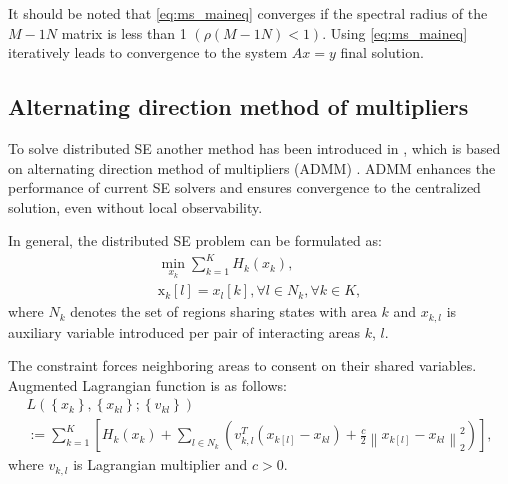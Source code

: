 It should be noted that \ref{eq:ms_maineq} converges if the spectral radius of the \(M-1N\) matrix is less than 1 \((\rho(M-1N) < 1)\). Using \ref{eq:ms_maineq} iteratively leads to convergence to the system \(Ax = y\) final solution.

\subsection{Alternating direction method of multipliers}\label{subsec:ch1/sec4/sub7}
To solve distributed SE another method has been introduced in \autocite{6340375}, which is based on alternating direction method of multipliers (ADMM) \autocite{boyd2004convex}. ADMM enhances the performance of current SE solvers and ensures convergence to the centralized solution, even without local observability.


In general, the distributed SE problem can be formulated as:
\begin{equation}
    \begin{array}{c}
\min _{x_{k}} \sum_{k=1}^{K} H_{k}\left(x_{k}\right), \\
\mathrm{x}_{k}[l]=x_{l}[k], \forall l \in N_{k}, \forall k \in K,
\end{array}
\end{equation}
where $N_k$ denotes the set of regions sharing states with area $k$ and $x_{k,l}$ is auxiliary variable introduced per pair of interacting areas $k$, $l$.

The constraint forces neighboring areas to consent on their shared variables. Augmented Lagrangian function is as follows:
\begin{equation}
    \begin{array}{c}
L\left(\left\{x_{k}\right\},\left\{x_{k l}\right\} ;\left\{v_{k l}\right\}\right) \\
:=\sum_{k=1}^{K}\left[H_{k}\left(x_{k}\right)+\sum_{l \in N_{k}}\left(v_{k, l}^{T}\left(x_{k[l]}-x_{k l}\right)+\frac{c}{2}\left\|x_{k[l]}-x_{k l}\right\|_{2}^{2}\right)\right],
\end{array}
\end{equation}
where $v_{k,l}$ is Lagrangian multiplier and \(c > 0\).

